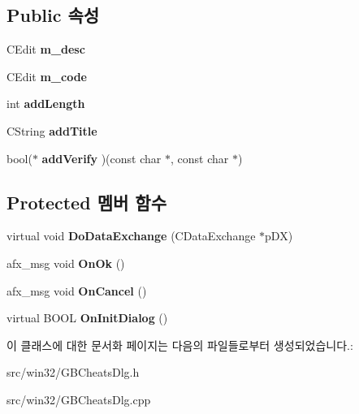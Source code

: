 \subsection*{Public 속성}
\begin{DoxyCompactItemize}
\item 
\mbox{\label{class_add_g_b_code_af67488ee0354c39ce9c818e7f389e74f}} 
C\+Edit {\bfseries m\+\_\+desc}
\item 
\mbox{\label{class_add_g_b_code_a1336063b1498bee29c2a9df7273d8ca9}} 
C\+Edit {\bfseries m\+\_\+code}
\item 
\mbox{\label{class_add_g_b_code_abed904b4077498637455cbd6f829a742}} 
int {\bfseries add\+Length}
\item 
\mbox{\label{class_add_g_b_code_a436954b9aea5bac8b7063a6939f829ae}} 
C\+String {\bfseries add\+Title}
\item 
\mbox{\label{class_add_g_b_code_a3c81ddb0e728491632442e95218f40cf}} 
bool($\ast$ {\bfseries add\+Verify} )(const char $\ast$, const char $\ast$)
\end{DoxyCompactItemize}
\subsection*{Protected 멤버 함수}
\begin{DoxyCompactItemize}
\item 
\mbox{\label{class_add_g_b_code_a7ae9f69b6acec1cb7816dc4959ba0b1c}} 
virtual void {\bfseries Do\+Data\+Exchange} (C\+Data\+Exchange $\ast$p\+DX)
\item 
\mbox{\label{class_add_g_b_code_ad6bdbbb8375531b30329c5ab4689c052}} 
afx\+\_\+msg void {\bfseries On\+Ok} ()
\item 
\mbox{\label{class_add_g_b_code_a0ebf90bce5407457b60eb77237adec17}} 
afx\+\_\+msg void {\bfseries On\+Cancel} ()
\item 
\mbox{\label{class_add_g_b_code_a1f7ec5a04ded3dee0016552b0961ffba}} 
virtual B\+O\+OL {\bfseries On\+Init\+Dialog} ()
\end{DoxyCompactItemize}


이 클래스에 대한 문서화 페이지는 다음의 파일들로부터 생성되었습니다.\+:\begin{DoxyCompactItemize}
\item 
src/win32/G\+B\+Cheats\+Dlg.\+h\item 
src/win32/G\+B\+Cheats\+Dlg.\+cpp\end{DoxyCompactItemize}
